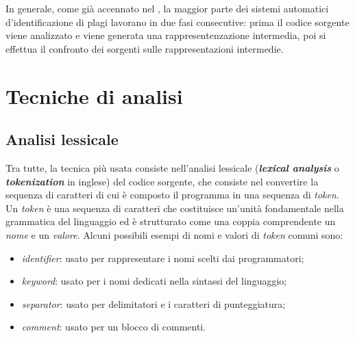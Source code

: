 

In generale, come già accennato nel , la maggior parte dei sistemi automatici d'identificazione di plagi lavorano in due fasi consecutive: prima il codice sorgente viene analizzato e viene generata una rappresentenzazione intermedia, poi si effettua il confronto dei sorgenti sulle rappresentazioni intermedie.

\section{Tecniche di analisi}

\subsection{Analisi lessicale}
Tra tutte, la tecnica più usata consiste nell'analisi lessicale (\textbf{\textit{lexical analysis}} o \textbf{\textit{tokenization}} in inglese) del codice sorgente, che consiste nel convertire la sequenza di caratteri di cui è composto il programma in una sequenza di \textit{token}.
%
Un \textit{token} è una sequenza di caratteri che costituisce un'unità fondamentale nella grammatica del linguaggio ed è strutturato come una coppia comprendente un \textit{nome} e un \textit{valore}.
%
Alcuni possibili esempi di nomi e valori di \textit{token} comuni sono:

\begin{itemize}
    \item \textit{identifier}: usato per rappresentare i nomi scelti dai programmatori;
    \item \textit{keyword}: usato per i nomi dedicati nella sintassi del linguaggio;
    \item \textit{separator}: usato per delimitatori e i caratteri di punteggiatura;
    \item \textit{comment}: usato per un blocco di commenti.
\end{itemize}

